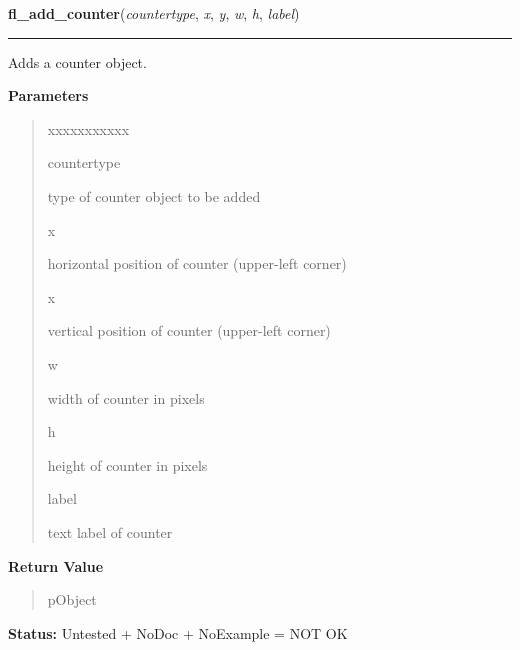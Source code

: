     \label{xformslib:library:fl_add_counter}

    \vspace{0.5ex}

\hspace{.8\funcindent}\begin{boxedminipage}{\funcwidth}

    \raggedright \textbf{fl\_add\_counter}(\textit{countertype}, \textit{x}, \textit{y}, \textit{w}, \textit{h}, \textit{label})

    \vspace{-1.5ex}

    \rule{\textwidth}{0.5\fboxrule}
\setlength{\parskip}{2ex}
    Adds a counter object.

\setlength{\parskip}{1ex}
      \textbf{Parameters}
      \vspace{-1ex}

      \begin{quote}
        \begin{Ventry}{xxxxxxxxxxx}

          \item[countertype]

          type of counter object to be added

          \item[x]

          horizontal position of counter (upper-left corner)

          \item[x]

          vertical position of counter (upper-left corner)

          \item[w]

          width of counter in pixels

          \item[h]

          height of counter in pixels

          \item[label]

          text label of counter

        \end{Ventry}

      \end{quote}

      \textbf{Return Value}
    \vspace{-1ex}

      \begin{quote}
      pObject

      \end{quote}

\textbf{Status:} Untested + NoDoc + NoExample = NOT OK



    \end{boxedminipage}


